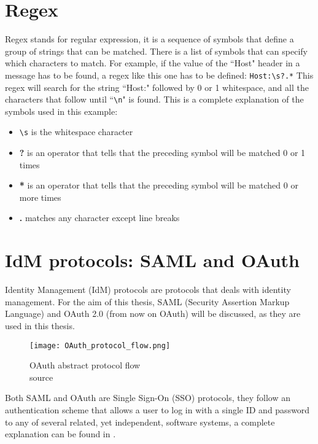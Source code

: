 \section{Regex}
Regex stands for regular expression, it is a sequence of symbols that define a group of strings that can be matched. There is a list of symbols that can specify which characters to match. For example, if the value of the ``Host" header in a message has to be found, a regex like this one has to be defined: \verb|Host:\s?.*|
This regex will search for the string ``Host:" followed by 0 or 1 whitespace, and all the characters that follow until ``\verb|\n|" is found. This is a complete explanation of the symbols used in this example:
\begin{itemize}
    \item \verb|\s| is the whitespace character
    \item \textbf{?} is an operator that tells that the preceding symbol will be matched 0 or 1 times
    \item \textbf{*} is an operator that tells that the preceding symbol will be matched 0 or more times
    \item \textbf{.} matches any character except line breaks
\end{itemize}

\section{IdM protocols: SAML and OAuth}
Identity Management (IdM) protocols are protocols that deals with identity management. For the aim of this thesis, \gls{SAML} (Security Assertion Markup Language) and \gls{OAuth} 2.0 (from now on \gls{OAuth}) will be discussed, as they are used in this thesis.
\begin{wrapfigure}{r}{0.5\textwidth}
    \texttt{[image: OAuth\_protocol\_flow.png]}
    \caption{OAuth abstract protocol flow\\source \cite{ietf_oauth2}}
    \label{fig:OAuth_protocol_flow}
\end{wrapfigure}
Both \Gls{SAML} and \gls{OAuth} are Single Sign-On (SSO) protocols, they follow an authentication scheme that allows a user to log in with a single ID and password to any of several related, yet independent, software systems, a complete explanation can be found in \cite{claudio_grisenti}. 

